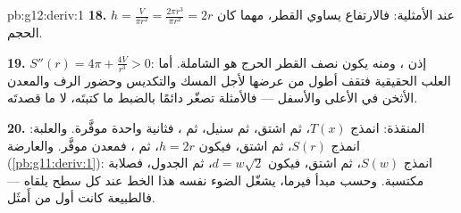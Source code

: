 \begin{solution}{pb:g12:deriv:1}
\textbf{18.} $h = \frac{V}{\pi r^2} = \frac{2\pi r^3}{\pi r^2}
= 2r$ عند الأمثلية: فالارتفاع يساوي القطر، مهما كان
الحجم.

\textbf{19.} $S''(r) = 4\pi + \frac{4V}{r^3} > 0$: إذن ، ومنه يكون
نصف القطر الحرج هو  الشاملة. أما العلب الحقيقية فتقف
أطول من عرضها لأجل المسك والتكديس وحضور الرف والمعدن الأثخن
في الأعلى والأسفل --- فالأمثلة تصغّر دائمًا بالضبط
ما كتبتَه، لا ما قصدتَه.

\textbf{20.} المنقذة: انمذج $T(x)$، ثم اشتق، ثم سنيل،
ثم ، فثانية واحدة موفَّرة. والعلبة: انمذج $S(r)$، ثم اشتق،
فيكون $h = 2r$، ثم ، فمعدن موفَّر. والعارضة
(\cref{pb:g11:deriv:1}): انمذج $S(w)$، ثم اشتق،
فيكون $d = w\sqrt2$، ثم الجدول، فصلابة مكتسبة. وحسب مبدأ
فيرما، يشغّل الضوء نفسه هذا الخط عند كل سطح
يلقاه --- فالطبيعة كانت أول من أَمثَل.
\end{solution}
